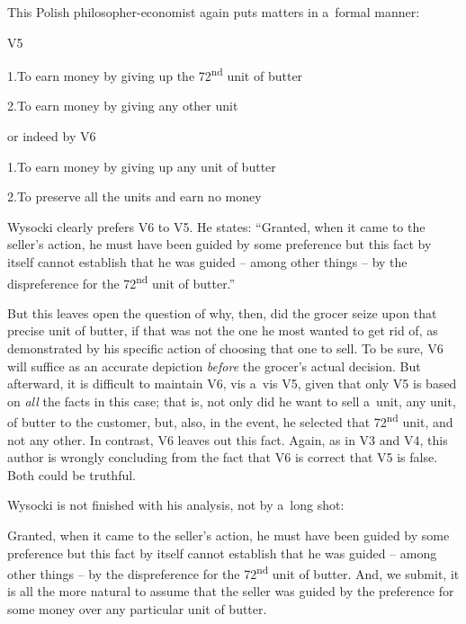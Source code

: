 This Polish philosopher-economist again puts matters in a~formal manner:



V5



1.To earn money by giving up the 72\textsuperscript{nd} unit of butter



2.To earn money by giving any other unit



or indeed by V6



1.To earn money by giving up any unit of butter



2.To preserve all the units and earn no money



Wysocki clearly prefers V6 to V5. He states: ``Granted, when it came to the seller's action, he must have been guided by some preference but this fact by itself cannot establish that he was guided -- among other things -- by the dispreference for the 72\textsuperscript{nd} unit of butter.''



But this leaves open the question of why, then, did the grocer seize upon that precise unit of butter, if that was not the one he most wanted to get rid of, as demonstrated by his specific action of choosing that one to sell. To be sure, V6 will suffice as an accurate depiction \textit{before} the grocer's actual decision. But afterward, it is difficult to maintain V6, vis a~vis V5, given that only V5 is based on \textit{all} the facts in this case; that is, not only did he want to sell a~unit, any unit, of butter to the customer, but, also, in the event, he selected that 72\textsuperscript{nd} unit, and not any other. In contrast, V6 leaves out this fact. Again, as in V3 and V4, this author is wrongly concluding from the fact that V6 is correct that V5 is false. Both could be truthful.



Wysocki is not finished with his analysis, not by a~long shot:



Granted, when it came to the seller's action, he must have been guided by some preference but this fact by itself cannot establish that he was guided -- among other things -- by the dispreference for the 72\textsuperscript{nd} unit of butter. And, we submit, it is all the more natural to assume that the seller was guided by the preference for some money over any particular unit of butter.



